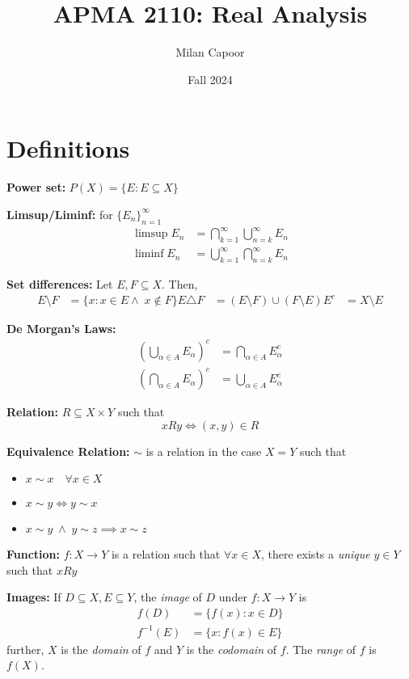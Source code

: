 \documentclass[12pt]{article}
\title{APMA 2110: Real Analysis}
\author{Milan Capoor}
\date{Fall 2024}
\newcommand{\sub}{\subseteq}
\begin{document}
\maketitle
\section*{Definitions}
    \textbf{Power set:} $P(X) = \{E: E \sub X\}$

    \textbf{Limsup/Liminf:} for $\{E_n\}_{n=1}^{\infty}$ 
    \begin{align*}
        \limsup E_n &= \bigcap_{k=1}^{\infty} \bigcup_{n=k}^{\infty} E_n \\
        \liminf E_n &= \bigcup_{k=1}^{\infty} \bigcap_{n=k}^{\infty} E_n
    \end{align*}

    \textbf{Set differences:} Let $E, F \sub X$. Then,
    \begin{align*}
        E \setminus F &= \{x: x \in E \land \; x \notin F\}
        E \triangle F &= (E \setminus F) \cup (F \setminus E)
        E^c &= X \setminus E
    \end{align*}

    \textbf{De Morgan's Laws:} 
    \begin{align*}
        \left(\bigcup_{\alpha \in A} E_{\alpha}\right)^c &= \bigcap_{\alpha \in A} E_{\alpha}^c \\
        \left(\bigcap_{\alpha \in A} E_{\alpha}\right)^c &= \bigcup_{\alpha \in A} E_{\alpha}^c
    \end{align*}

    \textbf{Relation:} $R \sub X \times Y$ such that 
    \[xRy \iff (x, y) \in R\]

    \textbf{Equivalence Relation:} $\sim$ is a relation in the case $X = Y$ such that 
    \begin{itemize}
        \item $x \sim x \quad \forall x \in X$
        \item $x \sim y \iff y \sim x$
        \item $x \sim y \; \land\; y\sim z \implies x \sim z$
    \end{itemize}

    \textbf{Function:} $f: X \to Y$ is a relation such that $\forall x \in X$, there exists a \emph{unique} $y \in Y$ such that $xRy$

    \textbf{Images:} If $D \sub X, E \sub Y$, the \emph{image} of $D$ under $f: X \to Y$ is 
    \begin{align*}
        f(D) &= \{f(x): x \in D\} \\
        f^{-1}(E) &= \{x: f(x) \in E\}
    \end{align*}
    further, $X$ is the \emph{domain} of $f$ and $Y$ is the \emph{codomain} of $f$. The \emph{range} of $f$ is $f(X)$.
\end{document}
